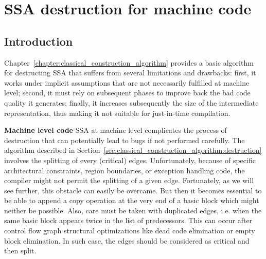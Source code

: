 \chapter{SSA destruction for machine code }
\graphicspath{{figs/}{part1/alternative_ssa_destruction_algorithm/figs/}{../part1/alternative_ssa_destruction_algorithm/figs/}}
\label{chap:alternative_ssa_destruction_algorithm}

\section{Introduction}
Chapter~\ref{chapter:classical_construction_algorithm} provides a basic algorithm for destructing SSA that suffers from several limitations and drawbacks: first, it works under implicit assumptions that are not necessarily fulfilled at machine level; second, it must rely on subsequent phases to improve back the bad code quality it generates; finally, it increases subsequently the size of the intermediate representation, thus making it not suitable for just-in-time compilation.   

{\bf Machine level code}
SSA at machine level complicates the process of destruction that can potentially lead to bugs if not performed carefully. The algorithm described in Section~\ref{sec:classical_construction_algorithm:destruction} involves the splitting of every (critical) edges. Unfortunately, because of specific architectural constraints, region boundaries, or exception handling code, the compiler might not permit the splitting of a given edge. Fortunately, as we will see further, this obstacle can easily be overcame. But then it becomes essential to be able to append a copy operation at the very end of a basic block which might neither be possible. Also, care must be taken with duplicated edges, i.e. when the same basic block appears twice in the list of predecessors.
This can occur after control flow graph structural optimizations like
dead code elimination or empty block elimination.
In such case, the edges should be considered as critical and then split.

